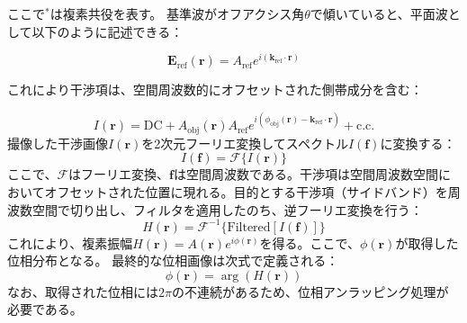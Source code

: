 ここで$^*$は複素共役を表す。
基準波がオフアクシス角$\theta$で傾いていると、平面波として以下のように記述できる：

\begin{equation}
\bm{E}_{\mathrm{ref}}(\bm{r}) = A_{\mathrm{ref}} e^{i (\bm{k}_{\mathrm{ref}} \cdot \bm{r})}
\end{equation}

これにより干渉項は、空間周波数的にオフセットされた側帯成分を含む：

\begin{equation}
I(\bm{r}) = \text{DC} + A_{\mathrm{obj}}(\bm{r}) A_{\mathrm{ref}} e^{i (\phi_{\mathrm{obj}}(\bm{r}) - \bm{k}_{\mathrm{ref}} \cdot \bm{r})} + \text{c.c.}
\end{equation}
撮像した干渉画像$I(\bm{r})$を2次元フーリエ変換してスペクトル$I(\bm{f})$に変換する：
\begin{equation}
I(\bm{f}) = \mathcal{F}\{ I(\bm{r}) \}
\end{equation}
ここで、$\mathcal{F}$はフーリエ変換、$\bm{f}$は空間周波数である。干渉項は空間周波数空間においてオフセットされた位置に現れる。目的とする干渉項（サイドバンド）を周波数空間で切り出し、フィルタを適用したのち、逆フーリエ変換を行う：
\begin{equation}
H(\bm{r}) = \mathcal{F}^{-1}\{ \text{Filtered}[I(\bm{f})] \}
\end{equation}
これにより、複素振幅$H(\bm{r}) = A(\bm{r}) e^{i \phi(\bm{r})}$を得る。ここで、$\phi(\bm{r})$が取得した位相分布となる。
最終的な位相画像は次式で定義される：
\begin{equation}
\phi(\bm{r}) = \arg \left( H(\bm{r}) \right)
\end{equation}
なお、取得された位相には$2\pi$の不連続があるため、位相アンラッピング処理が必要である。

